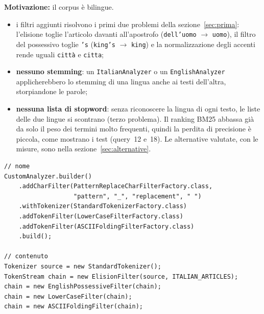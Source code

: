 \documentclass[11pt,a4paper]{article}
\newcommand{\code}[1]{\texttt{#1}}
\begin{document}
\textbf{Motivazione:} il corpus è bilingue.
\begin{itemize}
  \item i filtri aggiunti risolvono i primi due problemi della
        sezione~\ref{sec:prima}: l'elisione toglie l'articolo davanti all'apostrofo
        (\code{dell'uomo} $\rightarrow$ \code{uomo}), il filtro del possessivo toglie
        \code{'s} (\code{king's} $\rightarrow$ \code{king}) e la normalizzazione degli
        accenti rende uguali \code{città} e \code{citta};
  \item \textbf{nessuno stemming}: un \code{ItalianAnalyzer} o un
        \code{EnglishAnalyzer} applicherebbero lo stemming di una lingua anche ai
        testi dell'altra, storpiandone le parole;
  \item \textbf{nessuna lista di stopword}: senza riconoscere la lingua di ogni
        testo, le liste delle due lingue si scontrano (terzo problema). Il ranking
        BM25 abbassa già da solo il peso dei termini molto frequenti, quindi la perdita
        di precisione è piccola, come mostrano i test (query~12 e~18). Le
        alternative valutate, con le misure, sono nella
        sezione~\ref{sec:alternative}.
\end{itemize}

\begin{lstlisting}
// nome
CustomAnalyzer.builder()
    .addCharFilter(PatternReplaceCharFilterFactory.class,
                   "pattern", "_", "replacement", " ")
    .withTokenizer(StandardTokenizerFactory.class)
    .addTokenFilter(LowerCaseFilterFactory.class)
    .addTokenFilter(ASCIIFoldingFilterFactory.class)
    .build();

// contenuto
Tokenizer source = new StandardTokenizer();
TokenStream chain = new ElisionFilter(source, ITALIAN_ARTICLES);
chain = new EnglishPossessiveFilter(chain);
chain = new LowerCaseFilter(chain);
chain = new ASCIIFoldingFilter(chain);
\end{lstlisting}
\end{document}
